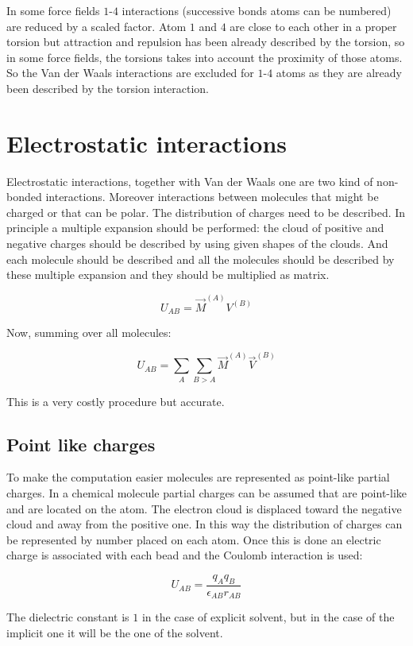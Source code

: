 	In some force fields $1$-$4$ interactions (successive bonds atoms can be numbered) are reduced by a scaled factor.
	Atom $1$ and $4$ are close to each other in a proper torsion but attraction and repulsion has been already described by the torsion, so in some force fields, the torsions takes into account the proximity of those atoms.
	So the Van der Waals interactions are excluded for $1$-$4$ atoms as they are already been described by the torsion interaction.


\section{Electrostatic interactions}
Electrostatic interactions, together with Van der Waals one are two kind of non-bonded interactions.
Moreover interactions between molecules that might be charged or that can be polar.
The distribution of charges need to be described.
In principle a multiple expansion should be performed: the cloud of positive and negative charges should be described by using given shapes of the clouds.
And each molecule should be described and all the molecules should be described by these multiple expansion and they should be multiplied as matrix.

$$U_{AB} = \vec{M}^{(A)}V^{(B)}$$

Now, summing over all molecules:

$$U_{AB} = \sum\limits_{A}\sum\limits_{B>A}\vec{M}^{(A)}\vec{V}^{(B)}$$

This is a very costly procedure but accurate.

	\subsection{Point like charges}
	To make the computation easier molecules are represented as point-like partial charges.
	In a chemical molecule partial charges can be assumed that are point-like and are located on the atom.
	The electron cloud is displaced toward the negative cloud and away from the positive one.
	In this way the distribution of charges can be represented by number placed on each atom.
	Once this is done an electric charge is associated with each bead and the Coulomb interaction is used:

	$$U_{AB} = \frac{q_Aq_B}{\epsilon_{AB}r_{AB}}$$

	The dielectric constant is $1$ in the case of explicit solvent, but in the case of the implicit one it will be the one of the solvent.

